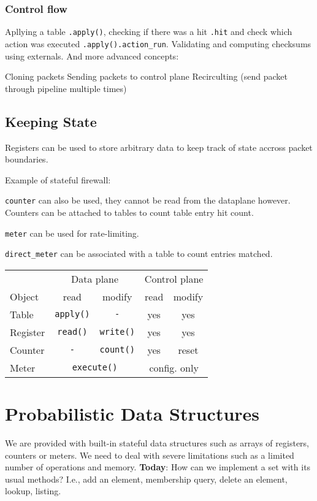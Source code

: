 \documentclass[a4paper, fontsize=8pt, landscape, DIV=1]{scrartcl}
\begin{document}
\begin{multicols*}{4}
  \subsubsection{Control flow}
  Apllying a table \texttt{.apply()}, checking if there was a hit \texttt{.hit} and check which action was executed \texttt{.apply().action\_run}. Validating and computing checksums
  using externals. And more advanced concepts:
  \begin{outline}
   \1 Cloning packets
   \1 Sending packets to control plane
   \1 Recirculting (send packet through pipeline multiple times)
  \end{outline}

  \subsection{Keeping State}
  Registers can be used to store arbitrary data to keep track of state accross
  packet boundaries.

  Example of stateful firewall:

  \texttt{counter} can also be used, they cannot be read from the dataplane however.
  Counters can be attached to tables to count table entry hit count.

  \texttt{meter} can be used for rate-limiting. 

  \texttt{direct\_meter} can be associated with a table to count entries matched.

  \begin{tabularx}{\linewidth}{l c c c c}
    \\ \hline
    {} & \multicolumn{2}{c}{Data plane} & \multicolumn{2}{c}{Control plane} \\ 
    Object & read & modify & read & modify \\
    \hline
    Table & \texttt{apply()} & \texttt{-} & yes & yes \\
    Register & \texttt{read()} & \texttt{write()} & yes & yes \\
    Counter & \texttt{-} & \texttt{count()} & yes & reset \\
    Meter & \multicolumn{2}{c}{\texttt{execute()}} & \multicolumn{2}{c}{config. only}
  \end{tabularx}


  \section{Probabilistic Data Structures}
  We are provided with built-in stateful data structures such as arrays of registers, 
  counters or meters. We need to deal with severe limitations such as a limited
  number of operations and memory. \textbf{Today}: How can we implement a set with
  its usual methods? I.e., add an element, membership query, delete an element,
  lookup, listing.


\end{multicols*}
\end{document}
